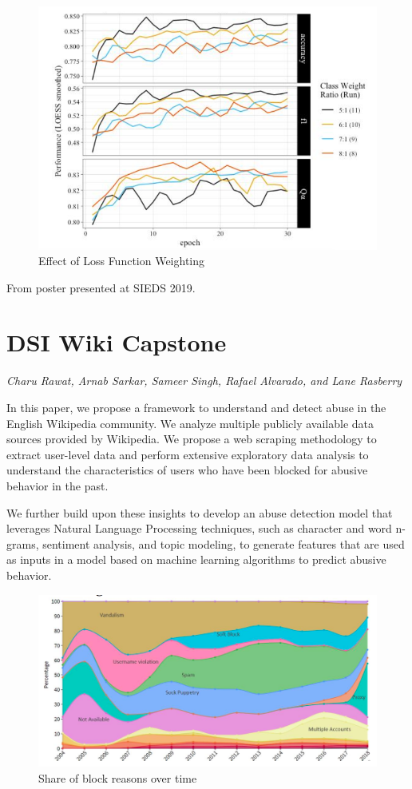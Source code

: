 \begin{figure}[!hbtp]
\includegraphics[width=\textwidth]{images/bmc2}
\caption{Effect of Loss Function Weighting}
\end{figure}



From poster presented at SIEDS 2019.

\section{DSI Wiki Capstone}
\label{sec:wik}

\emph{Charu Rawat, Arnab Sarkar, Sameer Singh, Rafael Alvarado, and Lane Rasberry}
\bigskip

In this paper, we propose a framework to understand and detect abuse in the English Wikipedia community. We analyze multiple publicly available data sources provided by Wikipedia. We propose a web scraping methodology to extract user-level data and perform extensive exploratory data analysis to understand the characteristics of users who have been blocked for abusive behavior in the past.

We further build upon these insights to develop an abuse detection model that leverages Natural Language Processing techniques, such as character and word n-grams, sentiment analysis, and topic modeling, to generate features that are used as inputs in a model based on machine learning algorithms to predict abusive behavior.

\begin{figure}[!hbtp]
\includegraphics[width=\textwidth]{images/wiki1}
\caption{Share of block reasons over time}
\end{figure}

